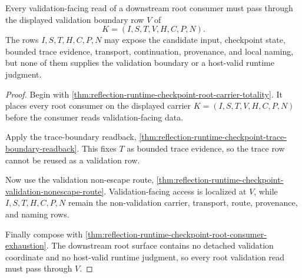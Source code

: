 \begin{theorem}
\label{thm:reflection-runtime-checkpoint-root-validator-boundary}
Every validation-facing read of a downstream root consumer must pass through the displayed validation boundary row $V$ of
$$
K=(I,S,T,V,H,C,P,N).
$$
The rows $I,S,T,H,C,P,N$ may expose the candidate input, checkpoint state, bounded trace evidence, transport, continuation, provenance, and local naming, but none of them supplies the validation boundary or a host-valid runtime judgment.
\end{theorem}
\begin{proof}
Begin with \autoref{thm:reflection-runtime-checkpoint-root-carrier-totality}. It places every root consumer on the displayed carrier $K=(I,S,T,V,H,C,P,N)$ before the consumer reads validation-facing data.

Apply the trace-boundary readback, \autoref{thm:reflection-runtime-checkpoint-trace-boundary-readback}. This fixes $T$ as bounded trace evidence, so the trace row cannot be reused as a validation row.

Now use the validation non-escape route, \autoref{thm:reflection-runtime-checkpoint-validation-nonescape-route}. Validation-facing access is localized at $V$, while $I,S,T,H,C,P,N$ remain the non-validation carrier, transport, route, provenance, and naming rows.

Finally compose with \autoref{thm:reflection-runtime-checkpoint-root-consumer-exhaustion}. The downstream root surface contains no detached validation coordinate and no host-valid runtime judgment, so every root validation read must pass through $V$.
\end{proof}

